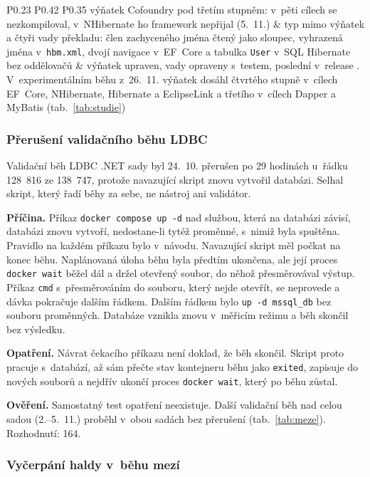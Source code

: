 {\begin{longtable}{P{0.23} P{0.42} P{0.35}}
výňatek Cofoundry pod třetím stupněm: v~pěti cílech se nezkompiloval, v~NHibernate ho framework nepřijal (5.~11.) & typ mimo výňatek a čtyři vady překladu: člen zachyceného jména čtený jako sloupec, vyhrazená jména v~\texttt{hbm.xml}, dvojí navigace v~EF~Core a tabulka \texttt{User} v~SQL Hibernate bez oddělovačů & výňatek upraven, vady opraveny s~testem, poslední v~release \Vydani. V~experimentálním běhu z~26.~11. výňatek dosáhl čtvrtého stupně v~cílech EF~Core, NHibernate, Hibernate a EclipseLink a třetího v~cílech Dapper a MyBatis (tab.~\ref{tab:studie}) \\
\end{longtable}}

\subsubsection*{Přerušení validačního běhu LDBC}

Validační běh LDBC .NET sady byl 24.~10. přerušen po 29 hodinách u~řádku 128~816 ze 138~747, protože navazující skript znovu vytvořil databázi. Selhal skript, který řadí běhy za sebe, ne nástroj ani validátor.

\textbf{Příčina.} Příkaz \texttt{docker compose up -d} nad službou, která na databázi závisí, databázi znovu vytvoří, nedostane-li tytéž proměnné, s~nimiž byla spuštěna. Pravidlo  na každém příkazu bylo v~návodu. Navazující skript měl počkat na konec běhu. Naplánovaná úloha běhu byla předtím ukončena, ale její proces \texttt{docker wait} běžel dál a držel otevřený soubor, do něhož přesměrovával výstup. Příkaz \texttt{cmd} s~přesměrováním do souboru, který nejde otevřít, se neprovede a dávka pokračuje dalším řádkem. Dalším řádkem bylo \texttt{up -d mssql\_db} bez souboru proměnných. Databáze vznikla znovu v~měřicím režimu a běh skončil bez výsledku.

\textbf{Opatření.} Návrat čekacího příkazu není doklad, že běh skončil. Skript proto pracuje s~databází, až sám přečte stav kontejneru běhu jako \texttt{exited}, zapisuje do nových souborů a nejdřív ukončí proces \texttt{docker wait}, který po běhu zůstal.

\textbf{Ověření.} Samostatný test opatření neexistuje. Další validační běh nad celou sadou (2.--5.~11.) proběhl v~obou sadách bez přerušení (tab.~\ref{tab:meze}). Rozhodnutí: 164.

\subsubsection*{Vyčerpání haldy v~běhu mezí}

